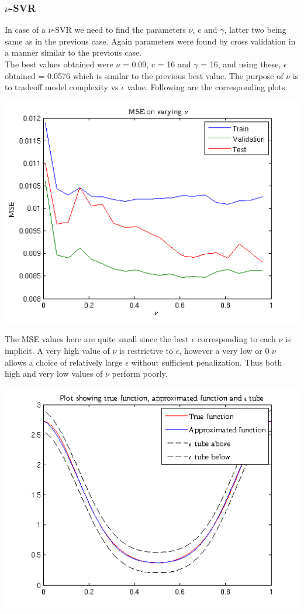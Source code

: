 \documentclass{article}
\begin{document}
\newpage
\subsubsection{$\nu$-SVR}
In case of a $\nu$-SVR we need to find the parameters $\nu$, c and $\gamma$, latter two being same as in the previous case. Again parameters were found by cross validation in a manner similar to the previous case. \\[5pt]
The best values obtained were $\nu$ = 0.09, c = 16 and $\gamma$ = 16, and using these, $\epsilon$ obtained = 0.0576 which is similar to the previous best value. The purpose of $\nu$ is to tradeoff model complexity vs $\epsilon$ value. Following are the corresponding plots.
\begin{center}
\includegraphics[scale=.7]{Regression/nu/mse}
\end{center}
The MSE values here are quite small since the best $\epsilon$ corresponding to each $\nu$ is implicit. A very high value of $\nu$ is restrictive to $\epsilon$, however a very low or 0 $\nu$ allows a choice of relatively large $\epsilon$ without sufficient penalization. Thus both high and very low values of $\nu$ perform poorly.
\begin{center}
\includegraphics[scale=.7]{Regression/nu/plot_1}
\end{center}
\end{document}
